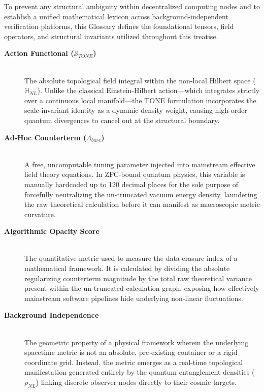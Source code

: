 \documentclass[11pt,a4paper]{article}
\theoremstyle{plain}
\theoremstyle{definition}
\begin{document}
To prevent any structural ambiguity within decentralized computing nodes and to establish a unified mathematical lexicon across background-independent verification platforms, this Glossary defines the foundational tensors, field operators, and structural invariants utilized throughout this treatise.

\begin{description}

    \item[\textbf{Action Functional ($\mathcal{S}_{TONE}$)}] \hfill \\
    The absolute topological field integral within the non-local Hilbert space ($\mathbb{H}_{NL}$). Unlike the classical Einstein-Hilbert action—which integrates strictly over a continuous local manifold—the TONE formulation incorporates the scale-invariant identity as a dynamic density weight, causing high-order quantum divergences to cancel out at the structural boundary.

    \item[\textbf{Ad-Hoc Counterterm ($\Lambda_{bare}$)}] \hfill \\
    A free, uncomputable tuning parameter injected into mainstream effective field theory equations. In ZFC-bound quantum physics, this variable is manually hardcoded up to 120 decimal places for the sole purpose of forcefully neutralizing the un-truncated vacuum energy density, laundering the raw theoretical calculation before it can manifest as macroscopic metric curvature.

    \item[\textbf{Algorithmic Opacity Score}] \hfill \\
    The quantitative metric used to measure the data-erasure index of a mathematical framework. It is calculated by dividing the absolute regularizing counterterm magnitude by the total raw theoretical variance present within the un-truncated calculation graph, exposing how effectively mainstream software pipelines hide underlying non-linear fluctuations.

    \item[\textbf{Background Independence}] \hfill \\
    The geometric property of a physical framework wherein the underlying spacetime metric is not an absolute, pre-existing container or a rigid coordinate grid. Instead, the metric emerges as a real-time topological manifestation generated entirely by the quantum entanglement densities ($\rho_{NL}$) linking discrete observer nodes directly to their cosmic targets.


\end{description}
\end{document}
